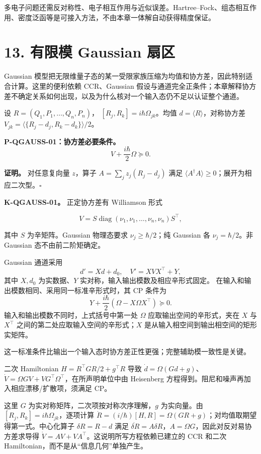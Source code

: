 \documentclass[
  11pt,
  oneside]{book}
\begin{document}
多电子问题还需反对称性、电子相互作用与近似误差。Hartree--Fock、组态相互作用、密度泛函等是可接入方法，不由本章一体解自动获得精度保证。

\chapter{13. 有限模 Gaussian 扇区}\label{ch-13}\hypertarget{ch-13}{}

Gaussian
模型把无限维量子态的某一受限家族压缩为均值和协方差，因此特别适合计算。这里的便利依赖
CCR、Gaussian
假设与通道完全正条件；本章解释协方差不确定关系如何出现，以及为什么核对一个输入态仍不足以认证整个通道。

设 \(R=(Q_1,P_1,\ldots,Q_n,P_n)\)，
\([R_j,R_k]=i\hbar\Omega_{jk}\)。均值 \(d=\langle R\rangle\)，对称协方差
\(V_{jk}=\langle\{R_j-d_j,R_k-d_k\}\rangle/2\)。

\protect\hypertarget{p-qgauss-01}{}{}

\textbf{P-QGAUSS-01：协方差必要条件。} \[
V+\frac{i\hbar}{2}\Omega\succeq0.
\]

\textbf{证明。} 对任意复向量 \(z\)，算子 \(A=\sum_jz_j(R_j-d_j)\) 满足
\(\langle A^\dagger A\rangle\ge0\)；展开为相应二次型。\(\square\)

\textbf{K-QGAUSS-01。} 正定协方差有 Williamson 形式

\[
V=S\operatorname{diag}(\nu_1,\nu_1,\ldots,\nu_n,\nu_n)S^\top,
\]

其中 \(S\) 为辛矩阵。Gaussian 物理态要求 \(\nu_j\ge\hbar/2\)；纯
Gaussian 各 \(\nu_j=\hbar/2\)。非 Gaussian 态不由前二阶矩确定。

Gaussian 通道采用 \[
d'=Xd+d_0,\quad V'=XVX^\top+Y,
\] 其中 \(X,d_0\) 为实数据、\(Y\) 实对称，输入输出模数及相应辛形式固定。
在输入和输出模数相同、采用同一标准辛形式时，其 CP 条件为 \[
Y+\frac{i\hbar}{2}(\Omega-X\Omega X^\top)\succeq0.
\] 输入和输出模数不同时，上式括号中第一处 \(\Omega\)
应取输出空间的辛形式，夹在 \(X\) 与 \(X^\top\)
之间的第二处应取输入空间的辛形式；\(X\)
是从输入相空间到输出相空间的矩形实矩阵。

这一标准条件比输出一个输入态时协方差正性更强；完整辅助模一致性是关键。

二次 Hamiltonian \(H=R^\top GR/2+g^\top R\) 导致
\(\dot d=\Omega(Gd+g)\)、\(\dot V=\Omega GV+VG^\top\Omega^\top\)，在所声明单位中由
Heisenberg 方程得到。阻尼和噪声再加入相应漂移/扩散项，须满足 CP。

这里 \(G\) 为实对称矩阵，二次项按对称次序理解，\(g\) 为实向量。由
\([R_j,R_k]=i\hbar\Omega_{jk}\)，逐项计算
\(\dot R=(i/\hbar)[H,R]=\Omega(GR+g)\)；对均值取期望得第一式。中心化算子
\(\delta R=R-d\) 满足
\(\dot{\delta R}=A\delta R\)，\(A=\Omega G\)，因此对反对易协方差求导得
\(\dot V=AV+VA^\top\)。这说明所写方程依赖已建立的 CCR 和二次
Hamiltonian，而不是从``信息几何''单独产生。
\end{document}
